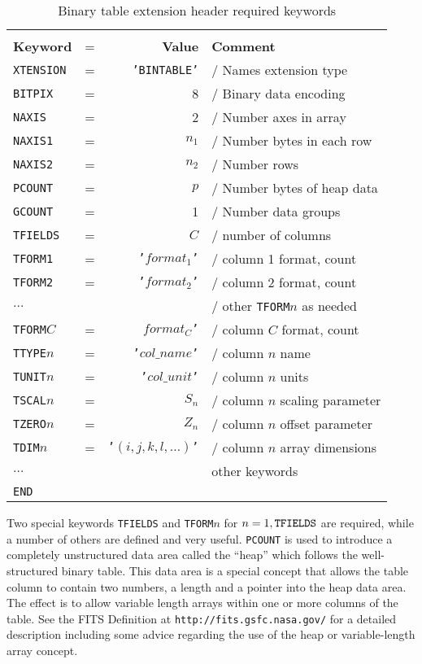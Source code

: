 \documentclass[twoside]{article}
\newcommand{\tablerowgapbefore}{-1ex}
\newcommand{\tablerowgapafter}{1ex}
\newcommand{\keyw}[1]{\hbox{{\tt #1}}}
\begin{document}
\begin{table}
\caption{Binary table extension header required keywords}
\label{tab:data.bintab}
\begin{center}
\begin{tabular}{|lrrl|}
\cline{1-4}
&  & & \\ [\tablerowgapbefore]
{\bf Keyword} & = & {\bf Value} & {\bf Comment} \\ [\tablerowgapafter]
\keyw{XTENSION} & = & \keyw{'BINTABLE'} & / Names extension type \\
\keyw{BITPIX}   & = & 8  & / Binary data encoding \\
\keyw{NAXIS}    & = & 2  & / Number axes in array \\
\keyw{NAXIS1}   & = & $n_1$ & / Number bytes in each row \\
\keyw{NAXIS2}   & = & $n_2$ & / Number rows \\
\keyw{PCOUNT}   & = & $p$   & / Number bytes of heap data \\
\keyw{GCOUNT}   & = & 1     & / Number data groups \\
\keyw{TFIELDS}  & = & $C$   & / number of columns \\
\keyw{TFORM1}   & = & {\tt '$format_1$'} & / column 1 format, count \\
\keyw{TFORM2}   & = & {\tt '$format_2$'} & / column 2 format, count \\
$\ldots$       &   &       & / other \keyw{TFORM$n$} as needed \\
\keyw{TFORM$C$} & = & {\tt $format_C$'} & / column $C$ format, count \\
\keyw{TTYPE$n$} & = & {\tt '$col\_name$'} & / column $n$ name \\
\keyw{TUNIT$n$} & = & {\tt '$col\_unit$'} & / column $n$ units \\
\keyw{TSCAL$n$} & = & $S_n$ & / column $n$ scaling parameter \\
\keyw{TZERO$n$} & = & $Z_n$ & / column $n$ offset parameter \\
\keyw{TDIM$n$}  & = & {\tt '$(i,j,k,l,\ldots)$'} &
                           / column $n$ array dimensions \\
$\ldots$       &   &       & other keywords \\
\keyw{END}      &   &       & \\ [\tablerowgapafter] \cline{1-4}
\end{tabular}
\end{center}
\end{table}
Two special keywords \keyw{TFIELDS} and \keyw{TFORM$n$} for $n = 1,
\keyw{TFIELDS}$ are required, while a number of others are defined and
very useful.  \keyw{PCOUNT} is used to introduce a completely
unstructured data area called the ``heap'' which follows the
well-structured binary table.  This data area is a special concept
that allows the table column to contain two numbers, a length and a
pointer into the heap data area.  The effect is to allow variable
length arrays within one or more columns of the table.  See the FITS
Definition at \keyw{http://fits.gsfc.nasa.gov/} for a detailed
description including some advice regarding the use of the heap or
variable-length array concept.
\end{document}
